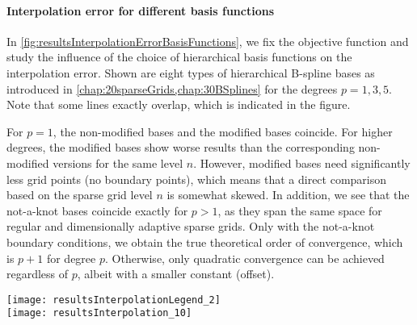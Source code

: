 \pagebreak

\paragraph{Interpolation error for different basis functions}

In \cref{fig:resultsInterpolationErrorBasisFunctions},
we fix the objective function and study the influence of the choice
of hierarchical basis functions on the interpolation error.
Shown are eight types of hierarchical B-spline bases as introduced in
\cref{chap:20sparseGrids,chap:30BSplines} for the degrees $p = 1, 3, 5$.
Note that some lines exactly overlap, which is indicated in
the figure.

For $p = 1$, the non-modified bases and the modified bases coincide.
For higher degrees, the modified bases show worse results than
the corresponding non-modified versions for the same level $n$.
However, modified bases need significantly less grid points
(no boundary points),
which means that a direct comparison based on the sparse grid level $n$
is somewhat skewed.
%
In addition, we see that the not-a-knot bases coincide exactly for $p > 1$,
as they span the same space for regular and
dimensionally adaptive sparse grids.
Only with the not-a-knot boundary conditions, we obtain the true
theoretical order of convergence, which is $p + 1$ for degree $p$.
Otherwise, only quadratic convergence can be achieved regardless of $p$,
albeit with a smaller constant (offset).

\begin{SCfigure}
  \begin{minipage}{98mm}%
    \hspace*{4mm}%
    \texttt{[image: resultsInterpolationLegend\_2]}\\[2mm]%
    \texttt{[image: resultsInterpolation\_10]}%
  \end{minipage}%
  \caption[Relative interpolation error for different basis functions]{%
    Relative $\Ltwo$ interpolation error
    $\normLtwo{\objfun - \sgintp}/\normLtwo{\objfun}$
    for the bivariate Alp02 function ($d = 2$)
    using different hierarchical basis functions
    $\basis{\*l,\*i}$ \emph{(colors)}
    of different degrees $p$ \emph{(line styles/markers)} and
    regular sparse grids $\regsgset{n}{d}$ of different levels $n$.\\
    The basis functions shown here involve
    standard \emph{(no superscript),}
    not-a-knot ($\mathrm{nak}$),
    modified ($\mathrm{mod}$),
    fundamental ($\mathrm{fs}$), and
    weakly fundamental ($\mathrm{wfs}$)
    splines as well as the combinations
    introduced in \cref{chap:20sparseGrids,chap:30BSplines}.%
  }%
  \label{fig:resultsInterpolationErrorBasisFunctions}%
\end{SCfigure}

